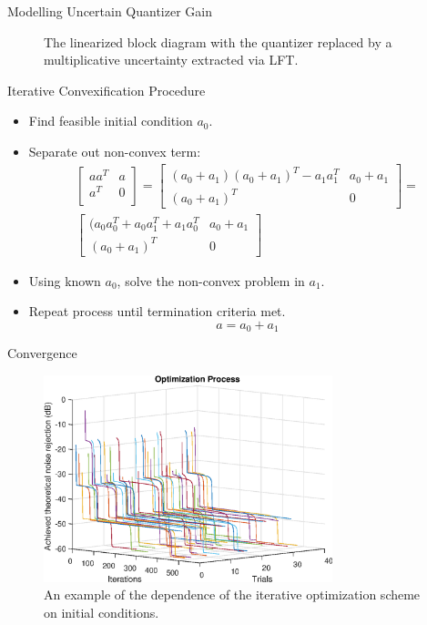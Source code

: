 \documentclass[10pt,usenames,dvipsnames]{beamer}
\begin{document}
\begin{frame}[fragile]{Modelling Uncertain Quantizer Gain}
\begin{figure}[h]
\begin{tikzpicture}[ampersand replacement=\&,scale=0.75, every node/.style={scale=0.75}]
	\end{tikzpicture}
	\caption{The linearized block diagram with the quantizer replaced by a multiplicative uncertainty extracted via LFT.}
\end{figure}

\end{frame}

\begin{frame}{Iterative Convexification Procedure}
	\begin{itemize}
		\item Find feasible initial condition $a_0$.
		\item Separate out non-convex term:
		\begin{multline*}
			\begin{bmatrix}
				aa^T & a \\
				a^T & 0 \\
			\end{bmatrix} = 
			\begin{bmatrix}
				(a_0 + a_1)(a_0 + a_1)^T - a_1a_1^T  & a_0 + a_1 \\
				(a_0 + a_1)^T & 0
			\end{bmatrix} = \\
			\begin{bmatrix}
				(a_0a_0^T + a_0a_1^T + a_1a_0^T & a_0 + a_1 \\
				(a_0 + a_1)^T & 0
			\end{bmatrix}		
		\end{multline*}
		\item Using known $a_0$, solve the non-convex problem in $a_1$.
		\item Repeat process until termination criteria met.
		\begin{equation*}
			a = a_0 + a_1
		\end{equation*}
	\end{itemize}
\end{frame}

\begin{frame}{Convergence}

\begin{figure}
	\centering
	\includegraphics[height=6cm]{opt-convergence}
	\caption{An example of the dependence of the iterative optimization scheme on initial conditions.}
\end{figure}

\end{frame}
\end{document}
